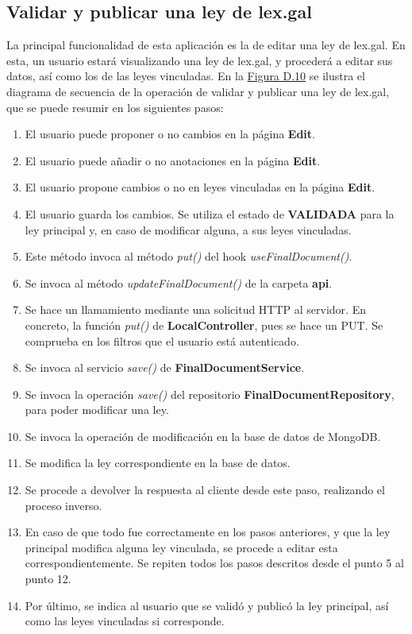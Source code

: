 \subsection{Validar y publicar una ley de lex.gal}

La principal funcionalidad de esta aplicación es la de editar una ley de lex.gal. En esta, un usuario estará visualizando una ley de lex.gal, y procederá a editar sus datos, así como los de las leyes vinculadas. En la \hyperref[enlaceDValidarLEXGAL]{Figura D.10} se ilustra el diagrama de secuencia de la operación de validar y publicar una ley de lex.gal, que se puede resumir en los siguientes pasos:

\begin{enumerate}
    \item El usuario puede proponer o no cambios en la página {\bf Edit}.
    \item El usuario puede añadir o no anotaciones en la página {\bf Edit}.
    \item El usuario propone cambios o no en leyes vinculadas en la página {\bf Edit}.
    \item El usuario guarda los cambios. Se utiliza el estado de {\bf VALIDADA} para la ley principal y, en caso de modificar alguna, a sus leyes vinculadas.
    \item Este método invoca al método {\it put()} del hook {\it useFinalDocument()}.
    \item Se invoca al método {\it updateFinalDocument()} de la carpeta  {\bf api}.
    \item Se hace un llamamiento mediante una solicitud HTTP al servidor. En concreto, la función {\it put()} de {\bf LocalController}, pues se hace un PUT. Se comprueba en los filtros que el usuario está autenticado.
    \item Se invoca al servicio {\it save()} de {\bf FinalDocumentService}.
    \item Se invoca la operación {\it save()} del repositorio {\bf FinalDocumentRepository}, para poder modificar una ley.
    \item Se invoca la operación de modificación en la base de datos de MongoDB.
    \item Se modifica la ley correspondiente en la base de datos.
    \item Se procede a devolver la respuesta al cliente desde este paso, realizando el proceso inverso.
    \item En caso de que todo fue correctamente en los pasos anteriores, y que la ley principal modifica alguna ley vinculada, se procede a editar esta correspondientemente. Se repiten todos los pasos descritos desde el punto 5 al punto 12.
    \item Por último, se indica al usuario que se validó y publicó la ley principal, así como las leyes vinculadas si corresponde.
\end{enumerate}